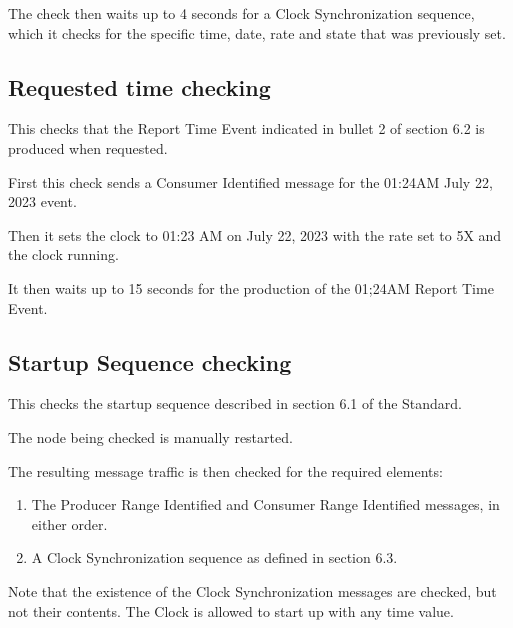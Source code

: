 The check then waits up to 4 seconds for a Clock Synchronization sequence, which it checks for
the specific time, date, rate and state that was previously set.

\subsection{Requested time checking}

This checks that the Report Time Event indicated in bullet 2 of section 6.2 is 
produced when requested.

First this check sends a Consumer Identified message for the 01:24AM  July 22, 2023 event.

Then it sets the clock to 01:23 AM on July 22, 2023 with the rate set to 5X and the clock running.

It then waits up to 15 seconds for the production of the 01;24AM Report Time Event.

\subsection{Startup Sequence checking}

This checks the startup sequence described in section 6.1 of the Standard.

The node being checked is manually restarted.

The resulting message traffic is then checked for the required elements:
\begin{enumerate}
\item The Producer Range Identified and Consumer Range Identified messages, in either order.
\item A Clock Synchronization sequence as defined in section 6.3.
\end{enumerate}

Note that the existence of the Clock Synchronization messages are checked, but not 
their contents.  The Clock is allowed to start up with any time value.
  

